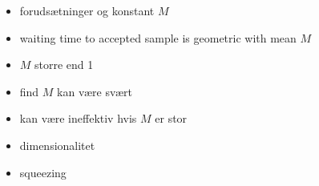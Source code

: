 \documentclass[aspectratio=169]{beamer}
\begin{document}
\begin{frame}
	\begin{itemize}
		\item forudsætninger og konstant $M$
		\item waiting time to accepted sample is geometric with mean $M$
		\item $M$ storre end 1
		\item find $M$ kan være svært
		\item kan være ineffektiv hvis $M$ er stor
		\item dimensionalitet
		\item squeezing
	\end{itemize}
\end{frame}
\end{document}
